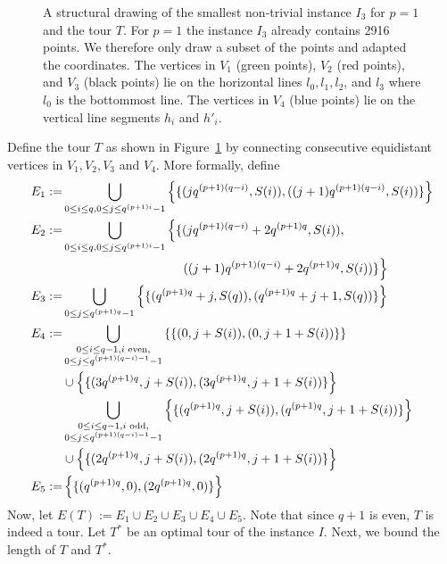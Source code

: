 \documentclass[a4paper, 11pt]{article}
\begin{document}
\begin{figure}
  \caption{A structural drawing of the smallest non-trivial instance $I_3$ for $p=1$ and the tour $T$. 
For $p=1$ the instance $I_3$ already contains 2916 points. We therefore only draw a subset of the points and adapted the coordinates.  
The vertices in $V_1$ (green points), $V_2$ (red points), and $V_3$ (black points) lie on the horizontal lines $l_0,l_1,l_2$, and $l_3$ where $l_0$ is the bottommost line. The vertices in $V_4$ (blue points) lie on the vertical line segments $h_i$ and $h'_i$. }
  \label{euclidean tour}
\end{figure}

Define the tour $T$ as shown in Figure~\ref{euclidean tour} by connecting consecutive equidistant vertices in $V_1,V_2,V_3$ and $V_4$.
More formally, define
\begin{align*}
E_1:=&\bigcup_{0\leq i\leq q, 0\leq j \leq q^{(p+1)i}-1} \left\{\{(jq^{(p+1)(q-i)},S(i)),((j+1)q^{(p+1)(q-i)},S(i))\}\right\}\\
E_2:=&\bigcup_{0\leq i\leq q, 0\leq j \leq q^{(p+1)i}-1} \left\{\{(jq^{(p+1)(q-i)}+2q^{(p+1)q}, S(i)),\right. \\
&\left.\hspace*{33mm}((j+1)q^{(p+1)(q-i)}+2q^{(p+1)q},S(i))\}\right\}\\
E_3:=&\bigcup_{0\leq j\leq q^{(p+1)q}-1} \left\{\{(q^{(p+1)q}+j,S(q)),(q^{(p+1)q}+j+1,S(q))\}\right\}\\
E_4:=&\bigcup_{\substack{0\leq i \leq q-1, i \text{ even},\\ 0\leq j\leq q^{(p+1)(q-i)-1}-1}} \left\{\{(0,j+S(i)),(0,j+1+S(i))\}\right\}\\
&\cup \left\{\{(3q^{(p+1)q},j+S(i)),(3q^{(p+1)q},j+1+S(i))\}\right\}\\
&\bigcup_{\substack{0\leq i \leq q-1, i \text{ odd},\\ 0\leq j\leq q^{(p+1)(q-i)-1}-1}} \left\{\{(q^{(p+1)q},j+S(i)),(q^{(p+1)q},j+1+S(i))\}\right\}\\
&\cup \left\{\{(2q^{(p+1)q},j+S(i)),(2q^{(p+1)q},j+1+S(i))\}\right\}\\
E_5:=&\left\{\{(q^{(p+1)q},0),(2q^{(p+1)q},0)\}\right\}
\end{align*}
Now, let $E(T):=E_1\cup E_2 \cup E_3\cup E_4 \cup E_5$.
Note that since $q+1$ is even, $T$ is indeed a tour. Let $T^*$ be an optimal tour of the instance $I$. Next, we bound the length of $T$ and $T^*$.
\end{document}
